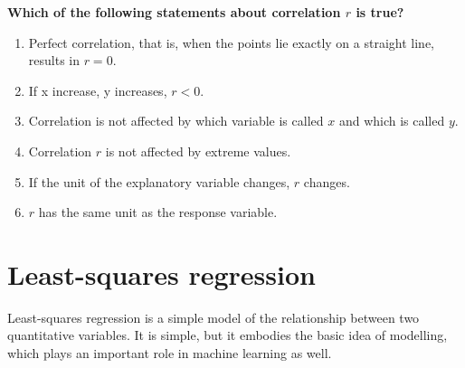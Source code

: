 \documentclass[a4paper, 12pt,twoside]{book}
\begin{document}
\vspace{0.6cm}
\colorbox{champagne}{
\begin{minipage}{\textwidth}
\textbf{Which of the following statements about correlation $r$ is true?}
\begin{enumerate}[(1)]
\item Perfect correlation, that is, when the points lie exactly on a straight line, results in $r = 0$.
\item If x increase, y increases, $r < 0$.
\item Correlation is not affected by which variable is called $x$ and which is called $y$.
\item Correlation $r$ is not affected by extreme values.
\item If the unit of the explanatory variable changes,  $r$ changes.
\item $r$ has the same unit as the response variable.

\end{enumerate}
\end{minipage}
}
\section{Least-squares regression}

Least-squares regression is a simple model of the relationship between two quantitative variables. It is simple, but it embodies the basic idea of modelling, which plays an important role in machine learning as well.
\end{document}
